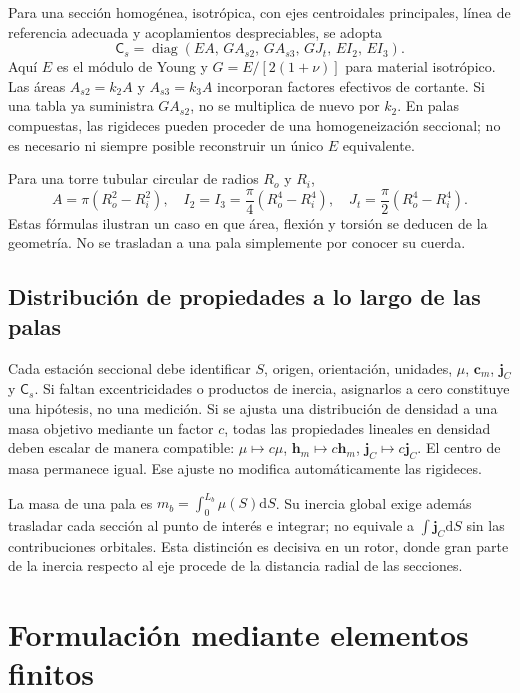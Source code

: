 \documentclass[11pt,a4paper,oneside]{report}
\newcommand{\vct}[1]{\bm{#1}}
\newcommand{\ten}[1]{\boldsymbol{#1}}
\newcommand{\dd}{\mathrm d}
\newcommand{\diag}{\operatorname{diag}}
\begin{document}
Para una sección homogénea, isotrópica, con ejes centroidales principales, línea de referencia adecuada y acoplamientos despreciables, se adopta
\begin{equation}
 \mathsf C_s=\diag(EA,\,G A_{s2},\,G A_{s3},\,GJ_t,\,EI_2,\,EI_3).
\end{equation}
Aquí $E$ es el módulo de Young y $G=E/[2(1+\nu)]$ para material isotrópico. Las áreas $A_{s2}=k_2A$ y $A_{s3}=k_3A$ incorporan factores efectivos de cortante. Si una tabla ya suministra $GA_{s2}$, no se multiplica de nuevo por $k_2$. En palas compuestas, las rigideces pueden proceder de una homogeneización seccional; no es necesario ni siempre posible reconstruir un único $E$ equivalente.

Para una torre tubular circular de radios $R_o$ y $R_i$,
\begin{equation}
 A=\pi(R_o^2-R_i^2),\quad I_2=I_3=\frac\pi4(R_o^4-R_i^4),\quad
 J_t=\frac\pi2(R_o^4-R_i^4).
\end{equation}
Estas fórmulas ilustran un caso en que área, flexión y torsión se deducen de la geometría. No se trasladan a una pala simplemente por conocer su cuerda.

\section{Distribución de propiedades a lo largo de las palas}
Cada estación seccional debe identificar $S$, origen, orientación, unidades, $\mu$, $\vct c_m$, $\ten j_C$ y $\mathsf C_s$. Si faltan excentricidades o productos de inercia, asignarlos a cero constituye una hipótesis, no una medición. Si se ajusta una distribución de densidad a una masa objetivo mediante un factor $c$, todas las propiedades lineales en densidad deben escalar de manera compatible: $\mu\mapsto c\mu$, $\vct h_m\mapsto c\vct h_m$, $\ten j_C\mapsto c\ten j_C$. El centro de masa permanece igual. Ese ajuste no modifica automáticamente las rigideces.

La masa de una pala es $m_b=\int_0^{L_b}\mu(S)\dd S$. Su inercia global exige además trasladar cada sección al punto de interés e integrar; no equivale a $\int\ten j_C\dd S$ sin las contribuciones orbitales. Esta distinción es decisiva en un rotor, donde gran parte de la inercia respecto al eje procede de la distancia radial de las secciones.
\chapter{Formulación mediante elementos finitos}
\label{ch:elementos}
\end{document}
